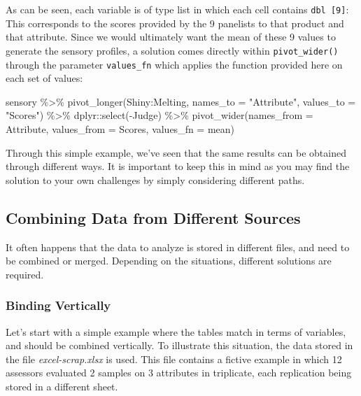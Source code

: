 \documentclass[
]{krantz}
\makeatletter
\newenvironment{Shaded}{\begin{snugshade}}{\end{snugshade}}
\newcommand{\AttributeTok}[1]{\textcolor[rgb]{0.61,0.61,0.61}{#1}}
\newcommand{\FunctionTok}[1]{\textcolor[rgb]{0,0,0}{#1}}
\newcommand{\NormalTok}[1]{#1}
\newcommand{\SpecialCharTok}[1]{\textcolor[rgb]{0,0,0}{#1}}
\newcommand{\StringTok}[1]{\textcolor[rgb]{0.5,0.5,0.5}{#1}}
\newenvironment{kframe}{%
\medskip{}
\setlength{\fboxsep}{.8em}
 \def\at@end@of@kframe{}%
 \ifinner\ifhmode%
  \def\at@end@of@kframe{\end{minipage}}%
  \begin{minipage}{\columnwidth}%
 \fi\fi%
 \def\FrameCommand##1{\hskip\@totalleftmargin \hskip-\fboxsep
 \colorbox{shadecolor}{##1}\hskip-\fboxsep
     \hskip-\linewidth \hskip-\@totalleftmargin \hskip\columnwidth}%
 \MakeFramed {\advance\hsize-\width
   \@totalleftmargin\z@ \linewidth\hsize
   \@setminipage}}%
 {\par\unskip\endMakeFramed%
 \at@end@of@kframe}
\renewenvironment{Shaded}{\begin{kframe}}{\end{kframe}}
\makeatother
\begin{document}
As can be seen, each variable is of type list in which each cell contains \texttt{dbl\ {[}9{]}}: This corresponds to the scores provided by the 9 panelists to that product and that attribute. Since we would ultimately want the mean of these 9 values to generate the sensory profiles, a solution comes directly within \texttt{pivot\_wider()} through the parameter \texttt{values\_fn} which applies the function provided here on each set of values:

\begin{Shaded}
\begin{Highlighting}[]
\NormalTok{sensory }\SpecialCharTok{\%\textgreater{}\%}
  \FunctionTok{pivot\_longer}\NormalTok{(Shiny}\SpecialCharTok{:}\NormalTok{Melting, }
               \AttributeTok{names\_to =} \StringTok{"Attribute"}\NormalTok{, }\AttributeTok{values\_to =} \StringTok{"Scores"}\NormalTok{) }\SpecialCharTok{\%\textgreater{}\%}
\NormalTok{  dplyr}\SpecialCharTok{::}\FunctionTok{select}\NormalTok{(}\SpecialCharTok{{-}}\NormalTok{Judge) }\SpecialCharTok{\%\textgreater{}\%}
  \FunctionTok{pivot\_wider}\NormalTok{(}\AttributeTok{names\_from =}\NormalTok{ Attribute, }\AttributeTok{values\_from =}\NormalTok{ Scores, }
              \AttributeTok{values\_fn =}\NormalTok{ mean)}
\end{Highlighting}
\end{Shaded}

Through this simple example, we've seen that the same results can be obtained through different ways. It is important to keep this in mind as you may find the solution to your own challenges by simply considering different paths.

\hypertarget{combining-data-from-different-sources}{%
\subsection{Combining Data from Different Sources}\label{combining-data-from-different-sources}}

It often happens that the data to analyze is stored in different files, and need to be combined or merged. Depending on the situations, different solutions are required.

\hypertarget{binding-vertically}{%
\subsubsection*{Binding Vertically}\label{binding-vertically}}


Let's start with a simple example where the tables match in terms of variables, and should be combined vertically. To illustrate this situation, the data stored in the file \emph{excel-scrap.xlsx} is used. This file contains a fictive example in which 12 assessors evaluated 2 samples on 3 attributes in triplicate, each replication being stored in a different sheet.
\end{document}
